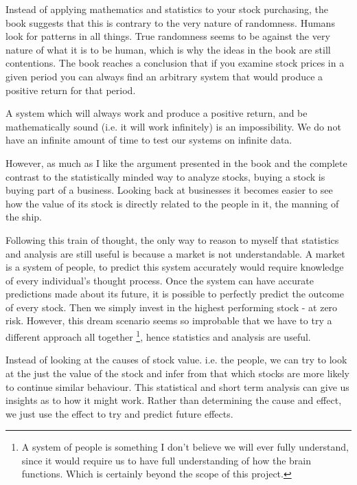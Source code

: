 \documentclass[11pt]{article}
\begin{document}
    Instead of applying mathematics and statistics to your stock purchasing, the book
    suggests that this is contrary to the 
    very nature of randomness. Humans look for patterns in all things. True 
    randomness seems to be against the very nature of what it is to be human, which is why
    the ideas in the book are still contentions. The book reaches a conclusion that
    if you examine stock prices in a given period you can always find an arbitrary
    system that would produce a positive return for that period.

    A system which will always work and produce a positive return, and be mathematically sound
    (i.e. it will work infinitely) is an impossibility. We do not have an infinite amount of
    time to test our systems on infinite data.

    However, as much as I like the argument presented in the book and the complete contrast to
    the statistically minded way to analyze stocks, buying a stock is buying part of a business.
    Looking back at businesses it becomes easier to see how the value of its stock is directly
    related to the people in it, the manning of the ship.

    Following this train of thought, the only way to reason to myself that statistics and
    analysis are still
    useful is because a market is not understandable. A market is a system of people, to predict this system accurately would require knowledge of every individual's
    thought process. Once the system can have accurate predictions made about its
    future, it is possible to perfectly predict the outcome of every stock. Then
    we simply invest in the highest performing stock - at zero risk. However, this
    dream scenario seems so improbable that we have to try a different approach
    all together
    \footnote{A system of people is something I don't believe we will ever fully understand,
    since it would require us to have full understanding of how the brain functions. Which
    is certainly beyond the scope of this project.}, hence statistics and analysis are
    useful.

    Instead of looking at the causes of stock value. i.e. the people, we can try to look
    at the just the value of the stock and infer from that which stocks are more
    likely to continue similar behaviour. This 
    statistical and short term analysis can give us insights as to 
    how it might work. Rather than determining the cause and effect, we just use the effect
    to try and predict future effects.
\end{document}
